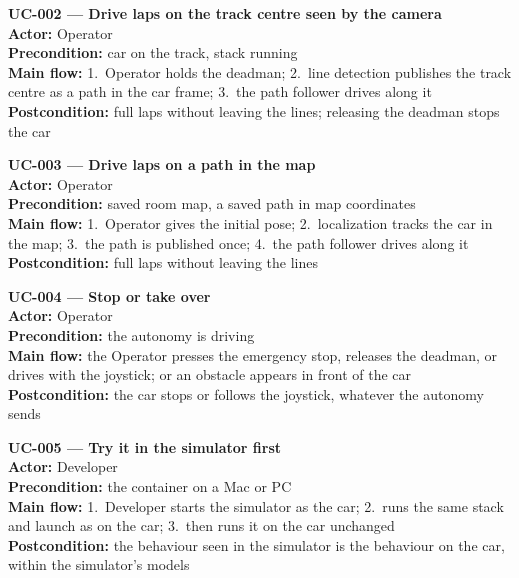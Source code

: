 \documentclass[11pt,a4paper]{article}
\begin{document}
\begin{takeaway}
\textbf{UC-002 --- Drive laps on the track centre seen by the camera}\\
\textbf{Actor:} Operator\\
\textbf{Precondition:} car on the track, stack running\\
\textbf{Main flow:} 1.~Operator holds the deadman; 2.~line detection publishes the track centre as a path in the car frame; 3.~the path follower drives along it\\
\textbf{Postcondition:} full laps without leaving the lines; releasing the deadman stops the car
\end{takeaway}

\begin{takeaway}
\textbf{UC-003 --- Drive laps on a path in the map}\\
\textbf{Actor:} Operator\\
\textbf{Precondition:} saved room map, a saved path in map coordinates \tbd[OI-03]\\
\textbf{Main flow:} 1.~Operator gives the initial pose; 2.~localization tracks the car in the map; 3.~the path is published once; 4.~the path follower drives along it\\
\textbf{Postcondition:} full laps without leaving the lines
\end{takeaway}

\begin{takeaway}
\textbf{UC-004 --- Stop or take over}\\
\textbf{Actor:} Operator\\
\textbf{Precondition:} the autonomy is driving\\
\textbf{Main flow:} the Operator presses the emergency stop, releases the deadman, or drives with the joystick; or an obstacle appears in front of the car\\
\textbf{Postcondition:} the car stops or follows the joystick, whatever the autonomy sends
\end{takeaway}

\begin{takeaway}
\textbf{UC-005 --- Try it in the simulator first}\\
\textbf{Actor:} Developer\\
\textbf{Precondition:} the container on a Mac or PC\\
\textbf{Main flow:} 1.~Developer starts the simulator as the car; 2.~runs the same stack and launch as on the car; 3.~then runs it on the car unchanged\\
\textbf{Postcondition:} the behaviour seen in the simulator is the behaviour on the car, within the simulator's models
\end{takeaway}
\end{document}
